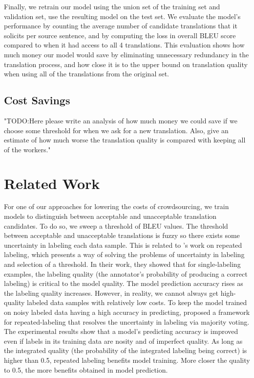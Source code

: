 \documentclass[11pt]{article}
\begin{document}
Finally, we retrain our model using the union set of the training set and validation set, use the resulting model on the test set.  We evaluate the model's performance by counting the average number of candidate translations that it solicits per source sentence, and by computing the loss in overall BLEU score compared to when it had access to all 4 translations.  This evaluation shows how much money our model would save by eliminating unnecessary redundancy in the translation process, and how close it is to the upper bound on translation quality when using all of the translations from the original set.

\subsection{Cost Savings}

"TODO:Here please write an analysis of how much money we could save if we choose some threshold for when we ask for a new translation.  Also, give an estimate of how much worse the translation quality is compared with keeping all of the workers."

\section{Related Work}

For one of our approaches for lowering the costs of crowdsourcing,  we train models to distinguish between acceptable and unacceptable translation candidates.  To do so,
we sweep a threshold of BLEU values. The threshold between acceptable and unacceptable translations is fuzzy so there exists some uncertainty in labeling each data sample.  This is related to \cite{sheng2008get}'s work on repeated labeling, which presents a way of solving the problems of   uncertainty in labeling and selection of a threshold. In their work, they showed that for single-labeling examples, the labeling quality (the annotator's probability of producing a correct labeling) is critical to the model quality. The model prediction accuracy rises as the labeling quality increases. However, in reality, we cannot always get high-quality labeled data samples with relatively low costs. To keep the model trained on noisy labeled data having a high accuracy in predicting,  proposed a framework for repeated-labeling that resolves the uncertainty in labeling via majority voting.  
The experimental results show that a model's predicting accuracy is improved even if labels in its training data are nosity and of imperfect quality.  As long as the integrated quality (the probability of the integrated labeling being correct) is higher than 0.5, repeated labeling benefits model training. More closer the quality to 0.5, the more benefits obtained in model prediction.
\end{document}
